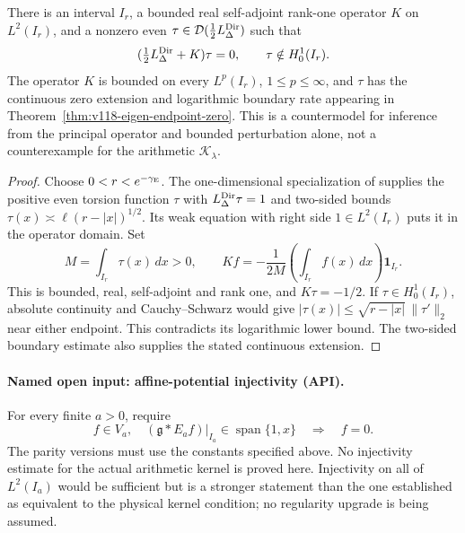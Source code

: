 \begin{proposition}
\label{prop:ns51-no-generic-bootstrap}
There is an interval $I_r$, a bounded real self-adjoint rank-one
operator $K$ on $L^2(I_r)$, and a nonzero even
$\tau\in\mathcal D(\tfrac12L_\Delta^{\rm Dir})$ such that
\[
 (\tfrac12L_\Delta^{\rm Dir}+K)\tau=0,
 \qquad \tau\notin H_0^1(I_r).
\]
The operator $K$ is bounded on every $L^p(I_r)$, $1\le p\le\infty$,
and $\tau$ has the continuous zero extension and logarithmic boundary
rate appearing in Theorem~\ref{thm:v118-eigen-endpoint-zero}.
This is a countermodel for inference from the principal operator and
bounded perturbation alone, not a counterexample for the arithmetic
$\mathcal K_\lambda$.
\end{proposition}
\begin{proof}
Choose $0<r<e^{-\gamma_{\rm E}}$. The one-dimensional specialization
of \cite[Theorem 1.2]{HLSLogBoundary} supplies the positive even torsion
function $\tau$ with $L_\Delta^{\rm Dir}\tau=1$ and two-sided bounds
$\tau(x)\asymp\ell(r-|x|)^{1/2}$. Its weak equation with right side
$1\in L^2(I_r)$ puts it in the operator domain. Set
\[
 M=\int_{I_r}\tau(x)\,dx>0,\qquad
 Kf=-\frac{1}{2M}\left(\int_{I_r}f(x)\,dx\right)\mathbf1_{I_r}.
\]
This is bounded, real, self-adjoint and rank one, and $K\tau=-1/2$.
If $\tau\in H_0^1(I_r)$, absolute continuity and Cauchy--Schwarz
would give $|\tau(x)|\le\sqrt{r-|x|}\,\|\tau'\|_2$ near either
endpoint. This contradicts its logarithmic lower bound. The two-sided
boundary estimate also supplies the stated continuous extension.
\end{proof}

\paragraph{Named open input: affine-potential injectivity (API).}
For every finite $a>0$, require
\begin{equation}\label{eq:ns51-api}
 f\in V_a,\quad (\mathfrak g*E_af)|_{I_a}\in
 \operatorname{span}\{1,x\}\quad\Longrightarrow\quad f=0.
\end{equation}
The parity versions must use the constants specified above. No
injectivity estimate for the actual arithmetic kernel is proved here.
Injectivity on all of $L^2(I_a)$ would be sufficient but is a stronger
statement than the one established as equivalent to the physical
kernel condition; no regularity upgrade is being assumed.

